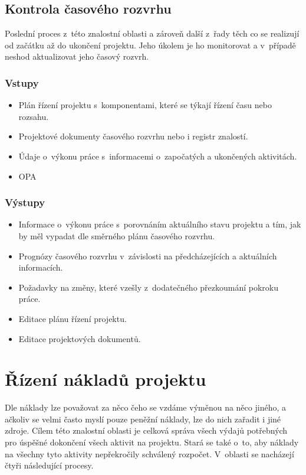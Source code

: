 \subsection*{Kontrola časového rozvrhu}

Poslední proces z~této znalostní oblasti a zároveň další z~řady těch co se realizují od začátku až do ukončení projektu. Jeho úkolem je ho monitorovat a v~případě neshod aktualizovat jeho časový rozvrh. 


\subsubsection*{Vstupy}
\begin{itemize}
    \item Plán řízení projektu s~komponentami, které se týkají řízení času nebo rozsahu.
    \item Projektové dokumenty časového rozvrhu nebo i registr znalostí.
    \item Údaje o~výkonu práce s~informacemi o~započatých a ukončených aktivitách.
    \item OPA
\end{itemize}
\subsubsection*{Výstupy}
\begin{itemize}
    \item Informace o~výkonu práce s~porovnáním aktuálního stavu projektu a tím, jak by měl vypadat dle směrného plánu časového rozvrhu. 
    \item Prognózy časového rozvrhu v~závislosti na předcházejících a aktuálních informacích.
    \item Požadavky na změny, které vzešly z~dodatečného přezkoumání pokroku práce.
    \item Editace plánu řízení projektu.
    \item Editace projektových dokumentů.
\end{itemize}



\section{Řízení nákladů projektu}
\label{RizeniNakladu}

Dle \cite{StrategieRizeni} náklady lze považovat za něco čeho se vzdáme výměnou na něco jiného, a ačkoliv se velmi často myslí pouze peněžní náklady, lze do nich zařadit i jiné zdroje. Cílem této znalostní oblasti je celková správa všech výdajů potřebných pro úspěšné dokončení všech aktivit na projektu. Stará se také o~to, aby náklady na všechny tyto aktivity nepřekročily schválený rozpočet. V~oblasti se nacházejí čtyři následující procesy.

